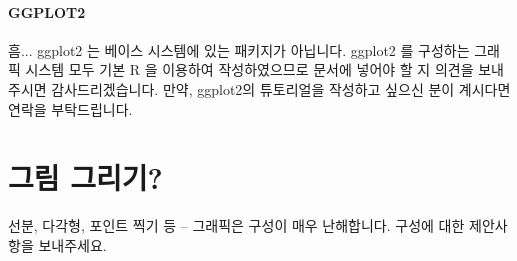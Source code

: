

\paragraph{GGPLOT2}
흠...  ggplot2 는 베이스 시스템에 있는 패키지가 아닙니다. 
ggplot2 를 구성하는 그래픽 시스템 모두 기본 R 을 이용하여 작성하였으므로 문서에 넣어야 할 지 의견을 보내주시면 감사드리겠습니다.
만약, ggplot2의 튜토리얼을 작성하고 싶으신 분이 계시다면 연락을 부탁드립니다. 



\section{그림 그리기?}

선분, 다각형, 포인트 찍기 등 -- 그래픽은 구성이 매우 난해합니다. 
구성에 대한 제안사항을 보내주세요.
